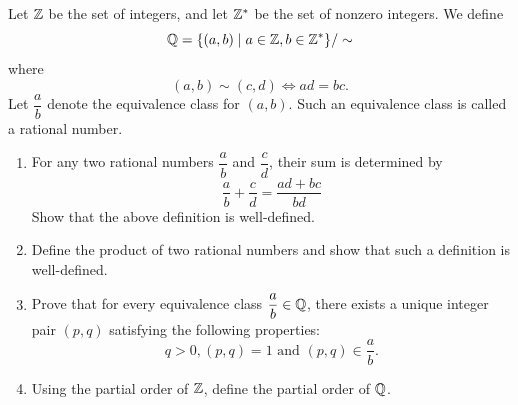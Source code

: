 
\begin{prbm} 
Let $\mathbb Z$ be the set of integers, and let $\mathbb Z^\ast$ be the set of nonzero integers. We define
\[ \mathbb Q = \{(a, b) \mid a \in \mathbb Z, b \in \mathbb Z^\ast\}/\sim \]
where
\[ (a, b) \sim (c, d) \iff ad = bc.\]
Let $\dfrac{a}{b}$ denote the equivalence class for $(a,b)$. Such an equivalence class is called a rational number.
\begin{enumerate}[label=(\alph*)]
\item For any two rational numbers $\dfrac{a}{b}$ and $\dfrac{c}{d}$, their sum is determined by
\[ \frac{a}{b}+\frac{c}{d}=\frac{ad+bc}{bd} \]
Show that the above definition is well-defined.

\item Define the product of two rational numbers and show that such a definition is well-defined.

\item Prove that for every equivalence class $\dfrac{a}{b} \in \mathbb Q$, there exists a unique integer pair $(p,q)$ satisfying the following properties:
\[ q>0, (p,q) = 1 \text{ and } (p,q) \in \frac{a}{b}.\]

\item Using the partial order of $\mathbb Z$, define the partial order of $\mathbb Q$.
\end{enumerate}
\end{prbm}

